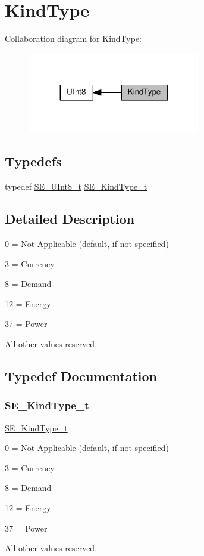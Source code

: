 \hypertarget{group__KindType}{}\section{Kind\+Type}
\label{group__KindType}
Collaboration diagram for Kind\+Type\+:\nopagebreak
\begin{figure}[H]
\begin{center}
\leavevmode
\includegraphics[width=215pt]{group__KindType}
\end{center}
\end{figure}
\subsection*{Typedefs}
\begin{DoxyCompactItemize}
\item 
typedef \hyperlink{group__UInt8_gaf7c365a1acfe204e3a67c16ed44572f5}{S\+E\+\_\+\+U\+Int8\+\_\+t} \hyperlink{group__KindType_gaaa33b4be52e2f2c6decfbdcb8d4edc21}{S\+E\+\_\+\+Kind\+Type\+\_\+t}
\end{DoxyCompactItemize}


\subsection{Detailed Description}
0 = Not Applicable (default, if not specified)

3 = Currency

8 = Demand

12 = Energy

37 = Power

All other values reserved. 

\subsection{Typedef Documentation}
\mbox{\label{group__KindType_gaaa33b4be52e2f2c6decfbdcb8d4edc21}} 
\subsubsection{\texorpdfstring{S\+E\+\_\+\+Kind\+Type\+\_\+t}{SE\_KindType\_t}}
{\footnotesize\ttfamily \hyperlink{group__KindType_gaaa33b4be52e2f2c6decfbdcb8d4edc21}{S\+E\+\_\+\+Kind\+Type\+\_\+t}}

0 = Not Applicable (default, if not specified)

3 = Currency

8 = Demand

12 = Energy

37 = Power

All other values reserved. 